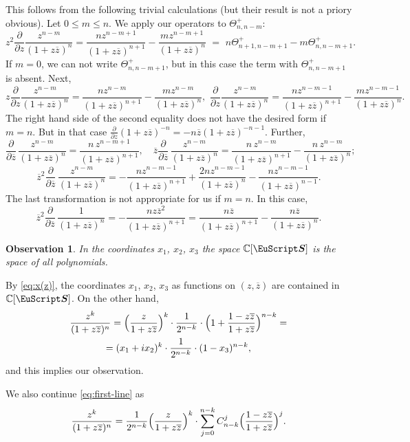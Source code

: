 \documentclass[]{amsart}
\newcounter{sec}
\newtheorem{observation}[theorem]{Observation}
\def\le{\leqslant}
\def\cS{\boldsymbol{\EuScript S}}
\def\C {{\mathbb C }}
\def\ov{\overline}
\def\sm{\smallskip}
\begin{document}
\sm

This follows from the following trivial calculations 
(but their result is not a priory obvious). Let $0\le m \le n$. We apply our operators
to $\Theta^+_{n,n-m}$:
$$
z^2 \frac{\partial}{\partial z} \frac{z^{n-m}} {(1+z \ov z)^n}
= \frac{n z^{n-m+1}}{(1+z\ov z)^{n+1}}-
\frac{m z^{n-m+1}}{(1+z\ov z)^{n}}\,\,
=\,\, n\Theta^+_{n+1,n-m+1}-m\Theta^+_{n,n-m+1}.
$$
If $m=0$, we can not write $\Theta^+_{n,n-m+1}$,
but in this case the term with $\Theta^+_{n,n-m+1}$
is absent.
 Next,
$$
z \frac{\partial}{\partial z} \frac{z^{n-m}} {(1+z \ov z)^n}
\!=\! \frac{n z^{n-m}}{(1+z\ov z)^{n+1}}-
\frac{m z^{n-m}}{(1+z\ov z)^{n}},
\,\, 
 \frac{\partial}{\partial z} \frac{z^{n-m}} {(1+z \ov z)^n}
\!=\! \frac{n z^{n-m-1}}{(1+z\ov z)^{n+1}}-
\frac{m z^{n-m-1}}{(1+z\ov z)^{n}}.
$$
The right hand side of the second equality does not have the desired form if $m=n$. But in that case $\frac{\partial}{\partial z} (1+z \ov z)^{-n}=-n \ov z (1+z \ov z)^{-n-1}$. Further, 
$$
\frac{\partial}{\partial \ov z}\,
\frac{z^{n-m}}
{(1+z \ov z)^{n}}=\frac{n\,z^{n-m+1}}
{(1+z \ov z)^{n+1}},\quad 
\ov z\frac{\partial}{\partial \ov z}\,
\frac{z^{n-m}}
{(1+z \ov z)^{n}}=\frac{n\,z^{n-m}}{(1+z \ov z)^{n+1}}-\frac{n\,z^{n-m}}{(1+z \ov z)^{n}};
$$
$$
\ov z^2\frac{\partial}{\partial \ov z}\,
\frac{z^{n-m}}
{(1+z \ov z)^{n}}=-\frac{n z^{n-m-1}}{(1+z \ov z)^{n+1}}+
\frac{2n z^{n-m-1}}{(1+z \ov z)^{n}}-
\frac{n z^{n-m-1}}{(1+z \ov z)^{n-1}}.
$$
The last transformation is not appropriate for us
if $m=n$. In this case,
$$
\ov z^2\frac{\partial}{\partial \ov z}\,
\frac{1}
{(1+z \ov z)^{n}}=-\frac{n z \ov z^2}{(1+z \ov z)^{n+1}}
=\frac{n \ov z}{(1+z \ov z)^{n+1}}- \frac{n \ov z}{(1+z \ov z)^{n}}.
$$ 

\begin{observation}
\label{obs:3}
 In the coordinates $x_1$, $x_2$, $x_3$ the space $\C[\cS]$ is the space of all polynomials. 
\end{observation}

By \eqref{eq:x(z)}, the coordinates $x_1$, $x_2$, $x_3$
as functions on $(z,\ov z)$ 
are contained in $\C[\cS]$. On the other hand,
\begin{multline}
\frac{z^k}{(1+z\ov z)^n}=\Bigl(\frac{z}{1+z\ov z}\Bigr)^k\cdot
 \frac1{2^{n-k}}\cdot
\Bigl(1+\frac{1-z\ov z}{1+z\ov z}\Bigr)^{n-k}=\\=
(x_1+i x_2)^k\cdot \frac1{2^{n-k}}\cdot (1-x_3)^{n-k},
\label{eq:first-line}
\end{multline}
and this implies our observation.

We also continue \eqref{eq:first-line} as
\begin{equation}
\frac{z^k}{(1+z\ov z)^n}= \frac1{2^{n-k}}
\Bigl(\frac{z}{1+z\ov z}\Bigr)^k\cdot\sum_{j=0}^{n-k} C_{n-k}^j \Bigl(\frac{1-z\ov z}{1+z\ov z}\Bigr)^j.
\label{eq:Theta-in-space}
\end{equation}
\end{document}
